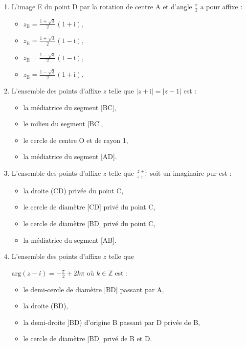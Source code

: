 \begin{enumerate}
     \item
     L'image E du point D par la rotation de centre A et d'angle $\frac{\pi }{3}$ a pour affixe :
     \begin{itemize}
          \item
          $z_{\text{E}}=\frac{1+\sqrt{3}}{2}\left(1+\text{i}\right)$,
          \item
          $z_{\text{E}}=\frac{1+\sqrt{3}}{2}\left(1-\text{i}\right)$,
          \item
          $z_{\text{E}}=\frac{1-\sqrt{3}}{2}\left(1-\text{i}\right)$,
          \item
          $z_{\text{E}}=\frac{1-\sqrt{3}}{2}\left(1+\text{i}\right)$,
     \end{itemize}
     \item
     L'ensemble des points d'affixe $z$ telle que $|z+\text{i}|=|z -1|$ est :
     \begin{itemize}
          \item
          la médiatrice du segment [BC],
          \item
          le milieu du segment [BC],
          \item
          le cercle de centre O et de rayon 1,
          \item
          la médiatrice du segment [AD].
     \end{itemize}
     \item
     L'ensemble des points d'affixe $z$ telle que $\frac{z+\text{i}}{z+1}$ soit un imaginaire pur est :
     \begin{itemize}
          \item
          la droite (CD) privée du point C,
          \item
          le cercle de diamètre [CD] privé du point C,
          \item
          le cercle de diamètre [BD] privé du point C,
          \item
          la médiatrice du segment [AB].
     \end{itemize}
     \item
     L'ensemble des points d'affixe $z$ telle que
     \par
     $\text{arg}\left(z-i\right)=- \frac{\pi }{2}+2 k\pi $ où $k \in \mathbb{Z}$ est :
     \begin{itemize}
          \item
          le demi-cercle de diamètre [BD] passant par A,
          \item
          la droite (BD),
          \item
          la demi-droite ]BD) d'origine B passant par D privée de B,
          \item
          le cercle de diamètre [BD] privé de B et D.
     \end{itemize}
\end{enumerate}
